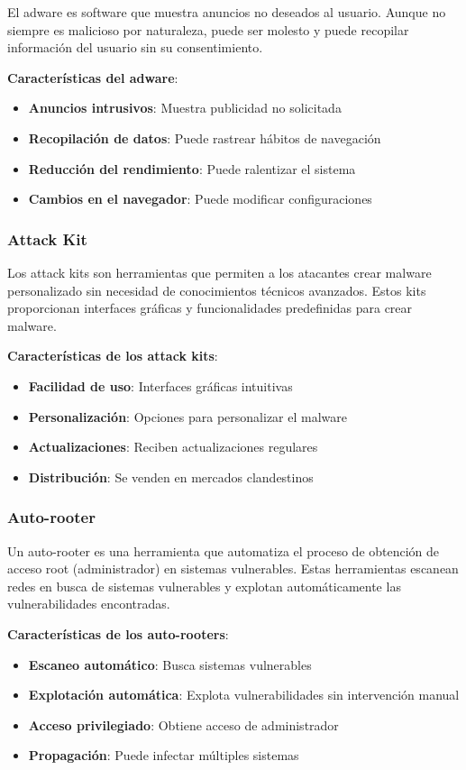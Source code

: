 El adware es software que muestra anuncios no deseados al usuario. Aunque no siempre es malicioso por naturaleza, puede ser molesto y puede recopilar información del usuario sin su consentimiento.

\textbf{Características del adware}:
\begin{itemize}
    \item \textbf{Anuncios intrusivos}: Muestra publicidad no solicitada
    \item \textbf{Recopilación de datos}: Puede rastrear hábitos de navegación
    \item \textbf{Reducción del rendimiento}: Puede ralentizar el sistema
    \item \textbf{Cambios en el navegador}: Puede modificar configuraciones
\end{itemize}

\subsubsection{Attack Kit}

Los attack kits son herramientas que permiten a los atacantes crear malware personalizado sin necesidad de conocimientos técnicos avanzados. Estos kits proporcionan interfaces gráficas y funcionalidades predefinidas para crear malware.

\textbf{Características de los attack kits}:
\begin{itemize}
    \item \textbf{Facilidad de uso}: Interfaces gráficas intuitivas
    \item \textbf{Personalización}: Opciones para personalizar el malware
    \item \textbf{Actualizaciones}: Reciben actualizaciones regulares
    \item \textbf{Distribución}: Se venden en mercados clandestinos
\end{itemize}

\subsubsection{Auto-rooter}

Un auto-rooter es una herramienta que automatiza el proceso de obtención de acceso root (administrador) en sistemas vulnerables. Estas herramientas escanean redes en busca de sistemas vulnerables y explotan automáticamente las vulnerabilidades encontradas.

\textbf{Características de los auto-rooters}:
\begin{itemize}
    \item \textbf{Escaneo automático}: Busca sistemas vulnerables
    \item \textbf{Explotación automática}: Explota vulnerabilidades sin intervención manual
    \item \textbf{Acceso privilegiado}: Obtiene acceso de administrador
    \item \textbf{Propagación}: Puede infectar múltiples sistemas
\end{itemize}

